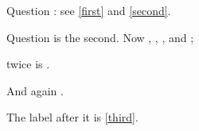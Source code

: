 \documentclass{article}
\newcounter{q}
\begin{document}
\label{first}Question \theq: see \ref{first} and \ref{second}.

\label{second}Question \theq{} is the second.
\setcounter{q}{5}Now , , ,  and ;
\addtocounter{q}{\value{q}}twice is \theq.

\addtocounter{q}{\value{q}}

And again \theq.

\addtocounter{q}{\value{q}}\label{third}The label after it is \ref{third}.
\end{document}
